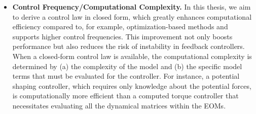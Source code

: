 \begin{itemize}
    \item \textbf{Control Frequency/Computational Complexity.} 
    In this thesis, we aim to derive a control law in closed form, which greatly enhances computational efficiency compared to, for example, optimization-based methods and supports higher control frequencies. This improvement not only boosts performance but also reduces the risk of instability in feedback controllers. When a closed-form control law is available, the computational complexity is determined by (a) the complexity of the model and (b) the specific model terms that must be evaluated for the controller. For instance, a potential shaping controller, which requires only knowledge about the potential forces, is computationally more efficient than a computed torque controller that necessitates evaluating all the dynamical matrices within the \glspl{EOM}.

\end{itemize}
